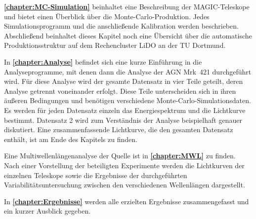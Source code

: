 \textbf{\autoref{chapter:MC-Simulation}} beinhaltet eine Beschreibung der MAGIC-Teleskope und bietet einen Überblick über die Monte-Carlo-Produktion.
Jedes Simulationsprogramm und die anschließende Kalibration werden beschrieben.
Abschließend beinhaltet dieses Kapitel noch eine Übersicht über die automatische Produktionsstruktur auf dem Rechencluster LiDO an der TU Dortmund.

In \textbf{\autoref{chapter:Analyse}} befindet sich eine kurze Einführung in die Analyseprogramme, mit denen dann die Analyse der AGN Mrk~421 durchgeführt wird.
Für diese Analyse wird der gesamte Datensatz in vier Teile geteilt, deren Analyse getrennt voneinander erfolgt.
Diese Teile unterscheiden sich in ihren äußeren Bedingungen und benötigen verschiedene Monte-Carlo-Simulationsdaten.
Es werden für jeden Datensatz einzeln das Energiespektrum und die Lichtkurve bestimmt.
Datensatz 2 wird zum Verständnis der Analyse beispielhaft genauer diskutiert.
Eine zusammenfassende Lichtkurve, die den gesamten Datensatz enthält, ist am Ende des Kapitels zu finden.

Eine Multiwellenlängenanalyse der Quelle ist in \textbf{\autoref{chapter:MWL}} zu finden.
Nach einer Vorstellung der beteiligten Experimente werden die Lichtkurven der einzelnen Teleskope sowie die Ergebnisse der durchgeführten Variabilitätsuntersuchung zwischen den verschiedenen Wellenlängen  dargestellt.

In \textbf{\autoref{chapter:Ergebnisse}} werden alle erzielten Ergebnisse zusammengefasst und ein kurzer Ausblick gegeben.